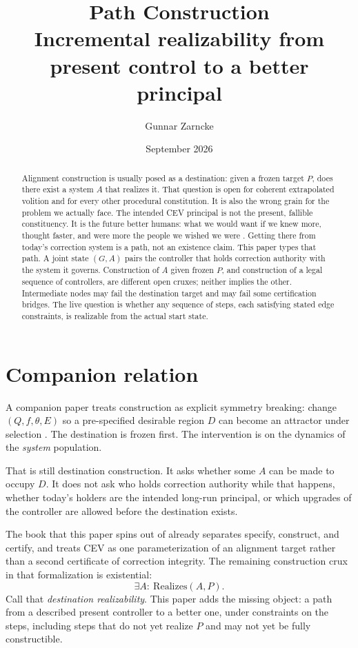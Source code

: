 \documentclass[11pt]{article}
\title{\textbf{Path Construction}\\
\large Incremental realizability from present control to a better principal}
\author{Gunnar Zarncke}
\date{September 2026}
\begin{document}
\maketitle

\begin{abstract}
Alignment construction is usually posed as a destination: given a frozen target \(P\), does there exist a system \(A\) that realizes it.
That question is open for coherent extrapolated volition and for every other procedural constitution.
It is also the wrong grain for the problem we actually face.
The intended CEV principal is not the present, fallible constituency.
It is the future better humans: what we would want if we knew more, thought faster, and were more the people we wished we were \parencite{yudkowsky2004cev}.
Getting there from today's correction system is a path, not an existence claim.
This paper types that path.
A joint state \((G,A)\) pairs the controller that holds correction authority with the system it governs.
Construction of \(A\) given frozen \(P\), and construction of a legal sequence of controllers, are different open cruxes; neither implies the other.
Intermediate nodes may fail the destination target and may fail some certification bridges.
The live question is whether any sequence of steps, each satisfying stated edge constraints, is realizable from the actual start state.
\end{abstract}

\section{Companion relation}

A companion paper treats construction as explicit symmetry breaking: change \((Q,f,\theta,E)\) so a pre-specified desirable region \(D\) can become an attractor under selection \parencite{zarncke2026attractors,zarncke2026selection}.
The destination is frozen first.
The intervention is on the dynamics of the \emph{system} population.

That is still destination construction.
It asks whether some \(A\) can be made to occupy \(D\).
It does not ask who holds correction authority while that happens, whether today's holders are the intended long-run principal, or which upgrades of the controller are allowed before the destination exists.

The book that this paper spins out of already separates specify, construct, and certify, and treats CEV as one parameterization of an alignment target rather than a second certificate of correction integrity.
The remaining construction crux in that formalization is existential:
\begin{equation}
    \exists A:\ \mathrm{Realizes}(A,P).
\end{equation}
Call that \emph{destination realizability}.
This paper adds the missing object: a path from a described present controller to a better one, under constraints on the steps, including steps that do not yet realize \(P\) and may not yet be fully constructible.
\end{document}
